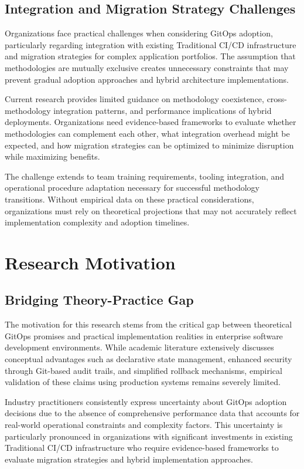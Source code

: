 \subsection{Integration and Migration Strategy Challenges}
Organizations face practical challenges when considering GitOps adoption, particularly regarding integration with existing Traditional CI/CD infrastructure and migration strategies for complex application portfolios. The assumption that methodologies are mutually exclusive creates unnecessary constraints that may prevent gradual adoption approaches and hybrid architecture implementations.

Current research provides limited guidance on methodology coexistence, cross-methodology integration patterns, and performance implications of hybrid deployments. Organizations need evidence-based frameworks to evaluate whether methodologies can complement each other, what integration overhead might be expected, and how migration strategies can be optimized to minimize disruption while maximizing benefits.

The challenge extends to team training requirements, tooling integration, and operational procedure adaptation necessary for successful methodology transitions. Without empirical data on these practical considerations, organizations must rely on theoretical projections that may not accurately reflect implementation complexity and adoption timelines.

\section{Research Motivation}

\subsection{Bridging Theory-Practice Gap}
The motivation for this research stems from the critical gap between theoretical GitOps promises and practical implementation realities in enterprise software development environments. While academic literature extensively discusses conceptual advantages such as declarative state management, enhanced security through Git-based audit trails, and simplified rollback mechanisms, empirical validation of these claims using production systems remains severely limited.

Industry practitioners consistently express uncertainty about GitOps adoption decisions due to the absence of comprehensive performance data that accounts for real-world operational constraints and complexity factors. This uncertainty is particularly pronounced in organizations with significant investments in existing Traditional CI/CD infrastructure who require evidence-based frameworks to evaluate migration strategies and hybrid implementation approaches.

